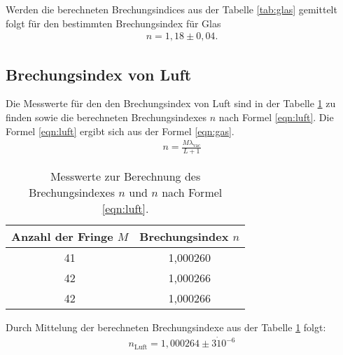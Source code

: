 Werden die berechneten Brechungsindices aus der Tabelle \ref{tab:glas} gemittelt folgt für den
bestimmten Brechungsindex für Glas
\begin{align*}
  n=1,18\pm0,04.
\end{align*}


\subsection{Brechungsindex von Luft}
Die Messwerte für den den Brechungsindex von Luft sind in der Tabelle \ref{tab:luft}
zu finden sowie die berechneten Brechungsindexes $n$ nach Formel \eqref{eqn:luft}.
Die Formel \eqref{eqn:luft} ergibt sich aus der Formel \eqref{eqn:gas}.
\begin{align}%
    n=\frac{M\lambda_\mathrm{vac}}{L+1}
\end{align}

\begin{table}
\centering
\caption{Messwerte zur Berechnung des Brechungsindexes $n$ und $n$ nach Formel \eqref{eqn:luft}.}
\label{tab:luft}
\begin{tabular}{c c}
\toprule
  Anzahl der Fringe $M$ & Brechungsindex $n$ \\
\midrule
41 &  1,000260\\
42 &  1,000266\\
42 &  1,000266\\
\bottomrule
\end{tabular}
\end{table}
Durch Mittelung der berechneten Brechungsindexe aus der Tabelle \ref{tab:luft}
folgt:
\begin{align*}
  n_\mathrm{Luft}=1,000264\pm 3\dot10^{-6}
\end{align*}
